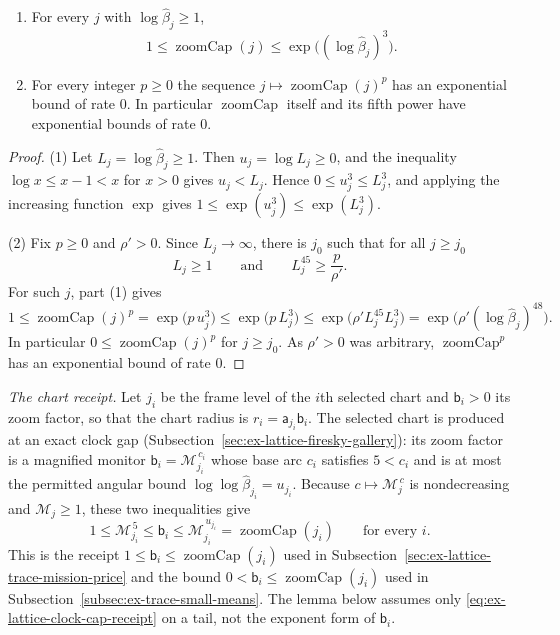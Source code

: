 \begin{lemma}
\label{lem:ex-lattice-trace-tiltcap-ticket}
\begin{enumerate}
 \item For every $j$ with $\log\widehat\beta_j\geq1$,
 \[
  1\leq\operatorname{zoomCap}(j)\leq\exp\bigl((\log\widehat\beta_j)^3\bigr).
 \]
 \item For every integer $p\geq0$ the sequence
 $j\mapsto\operatorname{zoomCap}(j)^p$ has an exponential bound of rate $0$. In
 particular $\operatorname{zoomCap}$ itself and its fifth power have
 exponential bounds of rate $0$.
\end{enumerate}
\end{lemma}

\begin{proof}
(1) Let $L_j=\log\widehat\beta_j\geq1$. Then $u_j=\log L_j\geq0$, and the
inequality $\log x\leq x-1<x$ for $x>0$ gives $u_j<L_j$. Hence
$0\leq u_j^3\leq L_j^3$, and applying the increasing function $\exp$ gives
$1\leq\exp(u_j^3)\leq\exp(L_j^3)$.

(2) Fix $p\geq0$ and $\rho'>0$. Since $L_j\to\infty$, there is $j_0$
such that for all $j\geq j_0$
\[
 L_j\geq1
 \qquad\text{and}\qquad
 L_j^{45}\geq\frac{p}{\rho'} .
\]
For such $j$, part (1) gives
\[
 1\leq\operatorname{zoomCap}(j)^p=\exp\bigl(p\,u_j^3\bigr)
 \leq\exp\bigl(p\,L_j^3\bigr)
 \leq\exp\bigl(\rho'L_j^{45}L_j^3\bigr)
 =\exp\bigl(\rho'(\log\widehat\beta_j)^{48}\bigr).
\]
In particular $0\leq\operatorname{zoomCap}(j)^p$ for $j\geq j_0$. As
$\rho'>0$ was arbitrary, $\operatorname{zoomCap}^p$ has an exponential bound of rate $0$.
\end{proof}

\emph{The chart receipt.} Let $j_i$ be the frame level of the $i$th
selected chart and $\mathsf b_i>0$ its zoom factor, so that the chart
radius is $r_i=\mathsf a_{j_i}\mathsf b_i$. The selected chart is
produced at an exact clock gap
(Subsection~\ref{sec:ex-lattice-firesky-gallery}): its zoom factor is a
magnified monitor $\mathsf b_i=\mathcal M_{j_i}^{\,c_i}$ whose base arc
$c_i$ satisfies $5<c_i$ and is at most the permitted angular bound
$\log\log\widehat\beta_{j_i}=u_{j_i}$. Because $c\mapsto\mathcal M_j^{\,c}$
is nondecreasing and $\mathcal M_j\geq1$, these two inequalities give
\begin{equation}
 1\leq\mathcal M_{j_i}^{\,5}\leq\mathsf b_i
 \leq\mathcal M_{j_i}^{\,u_{j_i}}=\operatorname{zoomCap}(j_i)
 \qquad\text{for every }i .
 \label{eq:ex-lattice-clock-cap-receipt}
\end{equation}
This is the receipt $1\leq\mathsf b_i\leq\operatorname{zoomCap}(j_i)$
used in Subsection~\ref{sec:ex-lattice-trace-mission-price} and the bound
$0<\mathsf b_i\leq\operatorname{zoomCap}(j_i)$ used in
Subsection~\ref{subsec:ex-trace-small-means}. The lemma below assumes only
\eqref{eq:ex-lattice-clock-cap-receipt} on a tail, not the exponent form
of $\mathsf b_i$.

